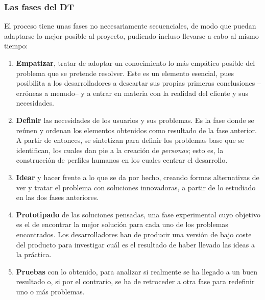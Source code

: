 \subsubsection{Las fases del DT}

El proceso tiene unas fases no necesariamente secuenciales, de modo que puedan adaptarse lo mejor posible al proyecto, pudiendo incluso llevarse a cabo al mismo tiempo:

\begin{enumerate}
	\item \textbf{Empatizar}, tratar de adoptar un conocimiento lo más empático posible del problema que se pretende resolver. Este es un elemento esencial, pues posibilita a los desarrolladores a descartar sus propias primeras conclusiones --erróneas a menudo-- y a entrar en materia con la realidad del cliente y sus necesidades.
	
	\item \textbf{Definir} las necesidades de los usuarios y sus problemas. Es la fase donde se reúnen y ordenan los elementos obtenidos como resultado de la fase anterior. A partir de entonces, se sintetizan para definir los problemas base que se identifican, los cuales dan pie a la creación de \textit{personas}; esto es, la construcción de perfiles humanos en los cuales centrar el desarrollo.
	
	\item \textbf{Idear} y hacer frente a lo que se da por hecho, creando formas alternativas de ver y tratar el problema con soluciones innovadoras, a partir de lo estudiado en las dos fases anteriores.
	
	\item \textbf{Prototipado} de las soluciones pensadas, una fase experimental cuyo objetivo es el de encontrar la mejor solución para cada uno de los problemas encontrados. Los desarrolladores han de producir una versión de bajo coste del producto para investigar cuál es el resultado de haber llevado las ideas a la práctica.
	
	\item \textbf{Pruebas} con lo obtenido, para analizar si realmente se ha llegado a un buen resultado o, si por el contrario, se ha de retroceder a otra fase para redefinir uno o más problemas.
	
\end{enumerate}

